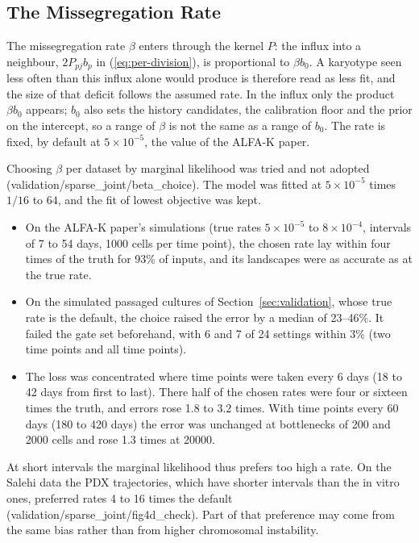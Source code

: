 \documentclass[11pt]{article}
\begin{document}
\subsection{The Missegregation Rate}
\label{sec:sj-beta}

The missegregation rate $\beta$ enters through the kernel $P$: the influx
into a neighbour, $2P_{pj}b_p$ in (\ref{eq:per-division}), is proportional to
$\beta b_0$. A karyotype seen less often than this influx alone would produce
is therefore read as less fit, and the size of that deficit follows the
assumed rate. In the influx only the product $\beta b_0$ appears; $b_0$ also
sets the history candidates, the calibration floor and the prior on the
intercept, so a range of $\beta$ is not the same as a range of $b_0$. The
rate is fixed, by default at $5\times10^{-5}$, the value of the ALFA-K paper.

Choosing $\beta$ per dataset by marginal likelihood was tried and not adopted
(validation/sparse\_joint/beta\_choice). The model was fitted at
$5\times10^{-5}$ times $1/16$ to $64$, and the fit of lowest objective was
kept.
\begin{itemize}
\item On the ALFA-K paper's simulations (true rates $5\times10^{-5}$ to
  $8\times10^{-4}$, intervals of 7 to 54 days, 1000 cells per time point),
  the chosen rate lay within four times of the truth for 93\% of inputs,
  and its landscapes were as accurate as at the true rate.
\item On the simulated passaged cultures of
  Section~\ref{sec:validation}, whose true rate is the default, the choice
  raised the error by a median of 23--46\%. It failed the gate set
  beforehand, with 6 and 7 of 24 settings within 3\% (two time points and all time points).
\item The loss was concentrated where time points were taken every 6 days
  (18 to 42 days from first to last). There half of the chosen rates were
  four or sixteen times the truth, and errors rose 1.8 to 3.2 times. With
  time points every 60 days (180 to 420 days) the error was unchanged at
  bottlenecks of 200 and 2000 cells and rose 1.3 times at 20000.
\end{itemize}
At short intervals the marginal likelihood thus prefers too high a rate. On
the Salehi data the PDX trajectories, which have shorter intervals than the
in vitro ones, preferred rates 4 to 16 times the default
(validation/sparse\_joint/fig4d\_check). Part of that preference may come from
the same bias rather than from higher chromosomal instability.
\end{document}
